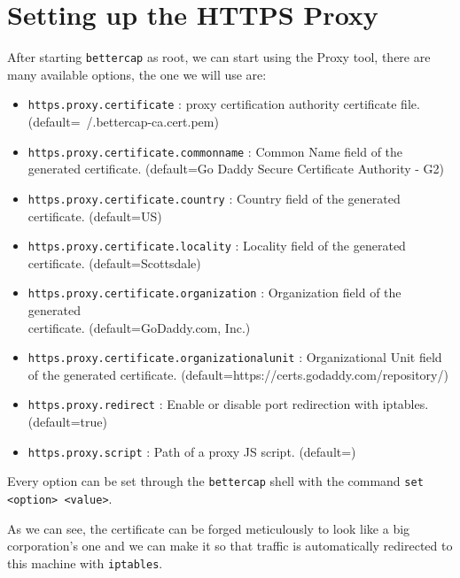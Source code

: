 \newpage


\section{Setting up the HTTPS Proxy}

After starting \verb|bettercap| as root, we can start using the  Proxy tool, there are many available options, the one we will use are:

\begin{itemize}
 \item \verb|https.proxy.certificate| :  proxy certification authority  certificate file. (default=~/.bettercap-ca.cert.pem)
 \item \verb|https.proxy.certificate.commonname| : Common Name field of the generated  certificate. (default=Go Daddy Secure Certificate Authority - G2)
 \item \verb|https.proxy.certificate.country| : Country field of the generated \\  certificate. (default=US)
 \item \verb|https.proxy.certificate.locality| : Locality field of the generated \\  certificate. (default=Scottsdale)
 \item \verb|https.proxy.certificate.organization| : Organization field of the generated \\  certificate. (default=GoDaddy.com, Inc.)
 \item \verb|https.proxy.certificate.organizationalunit| : Organizational Unit field of the generated  certificate. \newline(default=https://certs.godaddy.com/repository/)
 \item \verb|https.proxy.redirect| : Enable or disable port redirection with iptables. (default=true)
 \item \verb|https.proxy.script| : Path of a proxy JS script. (default=)
\end{itemize}

Every option can be set through the \verb|bettercap| shell with the command \verb|set <option> <value>|.

As we can see, the certificate can be forged meticulously to look like a big corporation's one and we can make it so that  traffic is automatically redirected to this machine with \verb|iptables|.


